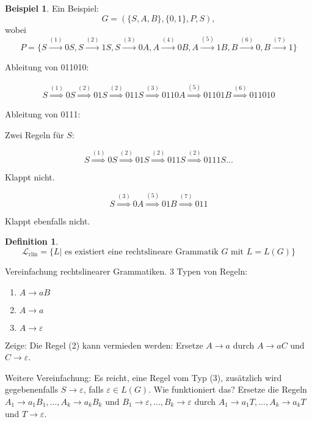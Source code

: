 \documentclass[11pt]{article} %
\theoremstyle{definition}
\newtheorem*{beispiel}{Beispiel}
\newtheorem{definition}{Definition}
\begin{document}
\begin{beispiel}
Ein Beispiel:
\[
G = (\{S,A,B\}, \{0,1\}, P, S),
\]
wobei
\[
P = \{ S \overset{(1)}{\rightarrow} 0S, S \overset{(2)}{\rightarrow} 1S, S \overset{(3)}{\rightarrow} 0A, A \overset{(4)}{\rightarrow} 0B, A \overset{(5)}{\rightarrow} 1B, B \overset{(6)}{\rightarrow} 0, B \overset{(7)}{\rightarrow} 1\}
\]

Ableitung von 011010:

\begin{eqnarray*}
S \overset{(1)}{\Rightarrow} 0S \overset{(2)}{\Rightarrow} 01S \overset{(2)}{\Rightarrow} 011S \overset{(3)}{\Rightarrow} 0110A \overset{(5)}{\Rightarrow} 01101B \overset{(6)}{\Rightarrow}011010
\end{eqnarray*}

Ableitung von 0111:

Zwei Regeln für $S$:

\[
S \overset{(1)}{\Rightarrow} 0S \overset{(2)}{\Rightarrow}01S \overset{(2)}{\Rightarrow} 011S \overset{(2)}{\Rightarrow} 0111S \dots
\]

Klappt nicht.

\[
S \overset{(3)}{\Rightarrow} 0A \overset{(5)}{\Rightarrow}01B \overset{(7)}{\Rightarrow} 011
\]

Klappt ebenfalls nicht.

\end{beispiel}

\begin{definition}
\[
\mathcal{L}_{\textrm{rlin}} = \{ L | \textrm{ es existiert eine rechtslineare Grammatik $G$ mit } L= L(G) \}
\]
\end{definition}

Vereinfachung rechtslinearer Grammatiken. 3 Typen von Regeln:

\begin{enumerate}[(1)]
\item $A \rightarrow aB$
\item $A \rightarrow a$
\item $A \rightarrow \varepsilon$
\end{enumerate}

Zeige: Die Regel (2) kann vermieden werden: Ersetze $A \rightarrow a$ durch $A\rightarrow aC$ und $C \rightarrow \varepsilon$.

Weitere Vereinfachung: Es reicht, eine Regel vom Typ (3), zusätzlich wird gegebenenfalls $S \rightarrow \varepsilon$, falls $\varepsilon \in L(G)$. Wie funktioniert das? Ersetze die Regeln $A_1 \rightarrow a_1B_1, \dots, A_k \rightarrow a_kB_k$ und
$B_1 \rightarrow \varepsilon, \dots, B_k \rightarrow \varepsilon$
durch
$A_1 \rightarrow a_1T, \dots, A_k \rightarrow a_kT$ und $T \rightarrow \varepsilon$.
\end{document}
